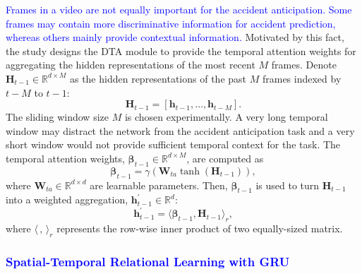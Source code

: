 \documentclass[journal]{IEEEtran}
\begin{document}
\textcolor{blue}{
Frames in a video are not equally important for the accident anticipation. Some frames may contain more discriminative information for accident prediction, whereas others mainly provide contextual information.} Motivated by this fact, the study designs the DTA module to provide the temporal attention weights for aggregating the hidden representations of the most recent $M$ frames.
Denote $\boldsymbol{H}_{t-1}\in\mathbb{R}^{d\times M}$ as the hidden representations of the past $M$ frames indexed by $t-M$ to $t-1$: 
\begin{equation}
    \boldsymbol{H}_{t-1}=[\boldsymbol{h}_{t-1}, \dots,  \boldsymbol{h}_{t-M}].
\end{equation}
The sliding window size $M$ is chosen experimentally. A very long temporal window may distract the network from the accident anticipation task and a very short window would not provide sufficient temporal context for the task. The temporal attention weights,  $\boldsymbol{\beta}_{t-1}\in\mathbb{R}^{d\times M}$, are computed as
\begin{equation}
\boldsymbol{\beta}_{t-1} = \gamma(\boldsymbol{W}_{ta} \tanh(\boldsymbol{H}_{t-1})),
\label{eq:temporal_attention}
\end{equation}
where $\boldsymbol{W}_{ta}\in\mathbb{R}^{d\times d}$ are learnable parameters. Then, $\boldsymbol{\beta}_{t-1}$ is used to turn $\boldsymbol{H}_{t-1}$ into a weighted aggregation, $\pmb{h}^\prime_{t-1}\in \mathbb{R}^{d}$:
\begin{equation}
\boldsymbol{h}^\prime_{t-1}=\langle\boldsymbol{\beta}_{t-1},\boldsymbol{H}_{t-1}\rangle_r,
\label{eq:temporal_energy}
\end{equation}
where $\langle\,,\,\rangle_r$ represents the row-wise inner product of two equally-sized matrix. 


\subsubsection{\textcolor{blue}{Spatial-Temporal Relational Learning with GRU}}
\end{document}

